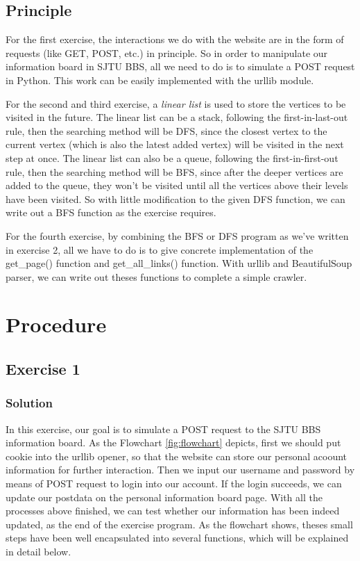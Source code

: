 \documentclass{article}
\begin{document}
\subsection{Principle}
\label{sec:principle}
For the first exercise, the interactions we do with the website are in the form of requests (like GET, POST, etc.) in principle. So in order to manipulate our information board in SJTU BBS, all we need to do is to simulate a POST request in Python. This work can be easily implemented with the urllib module.

For the second and third exercise, a \textit{linear list} is used to store the vertices to be visited in the future. The linear list can be a stack, following the first-in-last-out rule, then the searching method will be DFS, since the closest vertex to the current vertex (which is also the latest added vertex) will be visited in the next step at once. The linear list can also be a queue, following the first-in-first-out rule, then the searching method will be BFS, since after the deeper vertices are added to the queue, they won't be visited until all the vertices above their levels have been visited. So with little modification to the given DFS function, we can write out a BFS function as the exercise requires.

For the fourth exercise, by combining the BFS or DFS program as we've written in exercise 2, all we have to do is to give concrete implementation of the get\_page() function and get\_all\_links() function. With urllib and BeautifulSoup parser, we can write out theses functions to complete a simple crawler.


\section{Procedure}
\subsection{Exercise 1}

\subsubsection{Solution}
In this exercise, our goal is to simulate a POST request to the SJTU BBS information board. As the Flowchart \ref{fig:flowchart} depicts, first we should put cookie into the urllib opener, so that the website can store our personal acoount information for further interaction. Then we input our username and password by means of POST request to login into our account. If the login succeeds, we can update our postdata on the personal information board page. With all the processes above finished, we can test whether our information has been indeed updated, as the end of the exercise program. As the flowchart shows, theses small steps have been well encapsulated into several functions, which will be explained in detail below.
\end{document}
